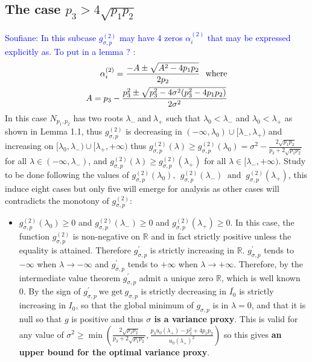\documentclass[a4paper, 10pt]{article}
\newcommand{\bea}{\begin{eqnarray}}
\newcommand{\eea}{\end{eqnarray}}
\theoremstyle{definition}
\begin{document}
\begin{itemize}
\subsection{The case $p_3 >  4\sqrt{p_1p_2}$}
  \textcolor{blue}{Soufiane: In this subcase $g^{(2)}_{\sigma, p}$ may have 4 zeros $\alpha_i^{(2)}$ that may be expressed explicitly as. To put in a lemma ? : 
    \bea \alpha_i^{(2)} = \frac{-A \pm \sqrt{A^2-4p_1p_2}}{2p_2} \ \ \text{where}\cr 
    A = p_3-\frac{p_3^2 \pm \sqrt{p_3^2-4\sigma^2(p_3^2-4p_1p_2)}}{2\sigma^2}
    \eea}
 In this case $N_{p_1, p_2}$ has two roots $\lambda_- \ \text{and} \ \lambda_+ $ such that  $\lambda_0 <\lambda_-$ and $\lambda_0 <\lambda_+$ as shown in Lemma 1.1, thus $g_{\sigma, p}^{(2)}$  is decreasing in $(-\infty, \lambda_0) \cup [\lambda_-, \lambda_+)$ and increasing on $[\lambda_0, \lambda_-)\cup [\lambda_+, +\infty)$ thus $g_{\sigma, p}^{(2)}(\lambda) \geq  g_{\sigma, p}^{(2)}(\lambda_0)=\sigma^2-\frac{2\sqrt{p_1p_2}}{p_3+2\sqrt{p_1p_2}}$ for all $\lambda \in (-\infty, \lambda_-)$, and  $g_{\sigma, p}^{(2)}(\lambda) \geq g_{\sigma, p}^{(2)}(\lambda_+)$ for all $\lambda \in [\lambda_-,+\infty)$. Study to be done following the values of $g_{\sigma, p}^{(2)}(\lambda_0), \ \ g_{\sigma, p}^{(2)}(\lambda_-) \ \text{ and } \ g_{\sigma, p}^{(2)}(\lambda_+)$, this induce eight cases but only five will emerge for analysis as other cases will contradicts the monotony of $g_{\sigma, p}^{(2)}$:
     \begin{itemize}
        \item  $g_{\sigma, p}^{(2)}(\lambda_0) \geq 0$ and $g_{\sigma, p}^{(2)}(\lambda_-) \geq 0$ and $g_{\sigma, p}^{(2)}(\lambda_+) \geq 0$. In this case, the function  $g_{\sigma,p}^{(2)}$ is non-negative on $\mathbb{R}$ and in fact strictly positive unless the equality is attained. Therefore $g_{\sigma, p}^{'}$ is strictly increasing in $\mathbb{R}$. $g^{'}_{\sigma,p}$ tends to $-\infty$ when  $\lambda\to -\infty$  and $g^{'}_{\sigma, p}$ tends to $+\infty$ when  $\lambda\to +\infty$. Therefore, by the intermediate value theorem $g_{\sigma, p}^{'}$ admit a unique zero $\mathbb{R}$, which is well known 0. By the sign of $g_{\sigma, p}^{'} \ \text{we get} \  g_{\sigma, p}$ is strictly decreasing in  $\bar{I_0}$ is strictly increasing in  $I_0$, so that the global minimum of $g_{\sigma, p}$ is in   $\lambda = 0$, and that it is null so that $g$ is positive and thus \textbf{$\sigma$ is a variance proxy}. This is valid for any value of $\sigma^2\geq \min(\frac{2\sqrt{p_1p_2}}{p_3+2\sqrt{p_1p_2}}, \frac{p_3u_0(\lambda_+)-p_3^2+4p_1p_2}{u_0(\lambda_+)^2})$ so this gives \textbf{an upper bound for the optimal variance proxy}. 

\end{itemize}
\end{itemize}
\end{document}
